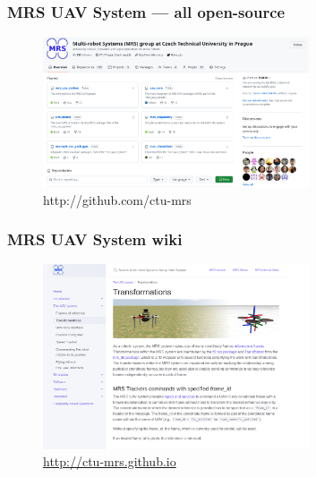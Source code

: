 \documentclass[aspectratio=169]{beamer}
\begin{document}
\begin{frame}
  \frametitle{MRS UAV System --- all open-source}

  \begin{figure}
    \centering
    \includegraphics[width=0.7\textwidth]{./fig/github.png}
    \huge {\color{blue} http://github.com/ctu-mrs}
  \end{figure}

\end{frame}



  \begin{frame}
    \frametitle{MRS UAV System wiki}
    \begin{figure}
      \vspace{-1em}
      \caption*{\url{http://ctu-mrs.github.io}}
      \includegraphics[width=0.7\textwidth]{fig/wiki.png}
    \end{figure}

  \end{frame}



\end{document}
